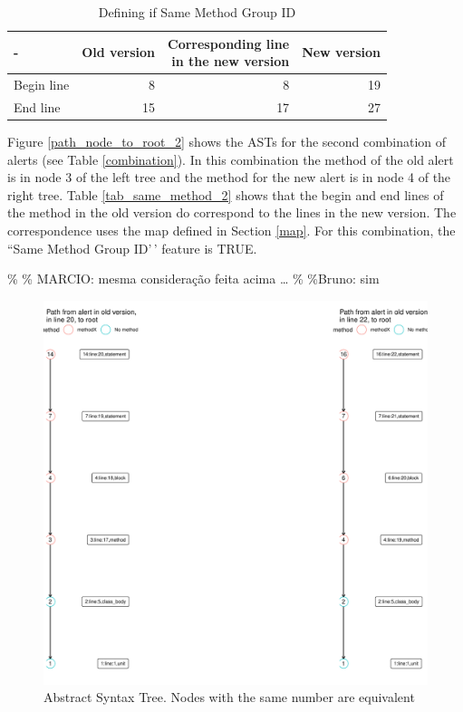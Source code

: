 \documentclass[
]{article}
\begin{document}
\normalsize

\small

\begin{table}[H]

\caption{\label{tab:unnamed-chunk-9}Defining if Same Method Group ID \label{tab_same_method}}
\centering
\begin{tabular}[t]{l|r|r|r}
\hline
- & Old version & \makecell[l]{Corresponding line\\in the new version} & New version\\
\hline
Begin line & 8 & 8 & 19\\
\hline
End line & 15 & 17 & 27\\
\hline
\end{tabular}
\end{table}

\normalsize

Figure \ref{path_node_to_root_2} shows the ASTs for the second
combination of alerts (see Table \ref{combination}). In this combination
the method of the old alert is in node 3 of the left tree and the method
for the new alert is in node 4 of the right tree. Table
\ref{tab_same_method_2} shows that the begin and end lines of the method
in the old version do correspond to the lines in the new version. The
correspondence uses the map defined in Section \ref{map}. For this
combination, the ``Same Method Group ID'\,' feature is TRUE.

\% \% MARCIO: mesma consideração feita acima \ldots{} \% \%Bruno: sim

\small

\begin{figure}[H]
\includegraphics[width=1\linewidth]{report_files/figure-latex/unnamed-chunk-10-1} \caption{Abstract Syntax Tree. Nodes with the same number are equivalent \label{path_node_to_root_2}}\label{fig:unnamed-chunk-10}
\end{figure}
\end{document}
